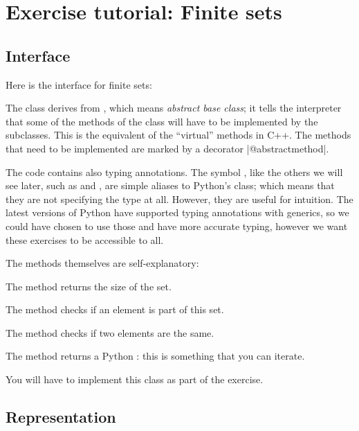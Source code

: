 \section{Exercise tutorial: Finite sets}\label{sec:exercise-tutorial}

\subsection*{Interface}
Here is the interface for finite sets:
%

The class derives from , which means \emph{abstract base class}; it tells the interpreter
that some of the methods of the class will have to be implemented by the subclasses. This is the equivalent
of the ``virtual'' methods in C++.
The methods that need to be implemented are marked by a decorator \pystr|@abstractmethod|.


The code contains also typing annotations.
The symbol , like the others we will see later, such as  and , are simple aliases to Python's  class; which means that they are not specifying the type at all.
However, they are useful for intuition.
The latest versions of Python have supported typing annotations with generics, so we could have chosen to use those and have more accurate typing, however we want these exercises to be accessible to all.

The methods themselves are self-explanatory:

\begin{compactitem}
  \item The method  returns the size of the set.
  \item The method  checks if an element is part of this set.
  \item The method  checks if two elements are the same.
  \item The method  returns a Python : this is something that you can iterate.
\end{compactitem}

You will have to implement this class as part of the exercise.


\subsection*{Representation}

